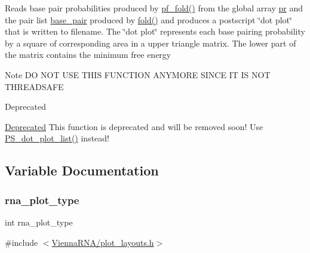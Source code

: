 Reads base pair probabilities produced by \hyperlink{group__pf__fold_gadc3db3d98742427e7001a7fd36ef28c2}{pf\+\_\+fold()} from the global array \hyperlink{fold__vars_8h_ac98ec419070aee6831b44e5c700f090f}{pr} and the pair list \hyperlink{fold__vars_8h_a0244a629b5ab4f58b77590c3dfd130dc}{base\+\_\+pair} produced by \hyperlink{group__mfe__fold__single_gaadafcb0f140795ae62e5ca027e335a9b}{fold()} and produces a postscript \char`\"{}dot plot\char`\"{} that is written to \textquotesingle{}filename\textquotesingle{}. The \char`\"{}dot plot\char`\"{} represents each base pairing probability by a square of corresponding area in a upper triangle matrix. The lower part of the matrix contains the minimum free energy \begin{DoxyNote}{Note}
DO N\+OT U\+SE T\+H\+IS F\+U\+N\+C\+T\+I\+ON A\+N\+Y\+M\+O\+RE S\+I\+N\+CE IT IS N\+OT T\+H\+R\+E\+A\+D\+S\+A\+FE
\end{DoxyNote}
\begin{DoxyRefDesc}{Deprecated}
\item[\hyperlink{deprecated__deprecated000130}{Deprecated}]This function is deprecated and will be removed soon! Use \hyperlink{group__plotting__utils_ga00ea223b5cf02eb2faae5ff29f0d5e12}{P\+S\+\_\+dot\+\_\+plot\+\_\+list()} instead! \end{DoxyRefDesc}


\subsection{Variable Documentation}
\mbox{\label{group__plotting__utils_ga5964c4581431b098b80027d6e14dcdd4}} 
\subsubsection{\texorpdfstring{rna\+\_\+plot\+\_\+type}{rna\_plot\_type}}
{\footnotesize\ttfamily int rna\+\_\+plot\+\_\+type}



{\ttfamily \#include $<$\hyperlink{plot__layouts_8h}{Vienna\+R\+N\+A/plot\+\_\+layouts.\+h}$>$}



